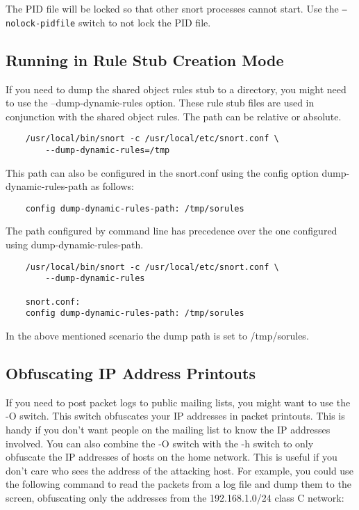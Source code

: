 \documentclass[english]{report}
\begin{document}
The PID file will be locked so that other snort processes cannot start.  Use
the \texttt{--nolock-pidfile} switch to not lock the PID file.

\subsection{Running in Rule Stub Creation Mode}

If you need to dump the shared object rules stub to a directory, you might need to use the --dump-dynamic-rules option. These rule stub files are used in conjunction with the shared object rules. The path can be relative or absolute. 

\begin{verbatim}
    /usr/local/bin/snort -c /usr/local/etc/snort.conf \
        --dump-dynamic-rules=/tmp
\end{verbatim}

This path can also be configured in the snort.conf using the config option dump-dynamic-rules-path as follows:

\begin{verbatim}
    config dump-dynamic-rules-path: /tmp/sorules
\end{verbatim}

The path configured by command line has precedence over the one configured using dump-dynamic-rules-path. 

\begin{verbatim}
    /usr/local/bin/snort -c /usr/local/etc/snort.conf \
        --dump-dynamic-rules

    snort.conf:
    config dump-dynamic-rules-path: /tmp/sorules
\end{verbatim}

In the above mentioned scenario the dump path is set to /tmp/sorules.

\subsection{Obfuscating IP Address Printouts}

If you need to post packet logs to public mailing lists, you might want to use
the -O switch. This switch obfuscates your IP addresses in packet printouts.
This is handy if you don't want people on the mailing list to know the IP
addresses involved. You can also combine the -O switch with the -h switch to
only obfuscate the IP addresses of hosts on the home network.  This is useful
if you don't care who sees the address of the attacking host.  For example, you
could use the following command to read the packets from a log file and dump
them to the screen, obfuscating only the addresses from the 192.168.1.0/24
class C network:
 
\end{document}
